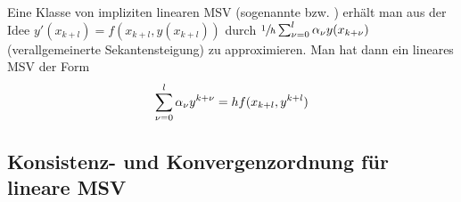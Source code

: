 Eine Klasse von impliziten linearen MSV (sogenannte  bzw. ) erhält man aus der Idee $y'(x_{k+l}) = f(x_{k+l},y(x_{k+l}))$ durch $\sfrac{1}{h}\sum_{\nu=0}^l \alpha_\nu y(x_{k+\nu})$ (verallgemeinerte Sekantensteigung) zu approximieren. Man hat dann ein lineares MSV der Form
\begin{align}
	\sum_{\nu=0}^l \alpha_\nu y^{k+\nu} = hf(x_{k+l},y^{k+l}) \notag
\end{align}

\subsection{Konsistenz- und Konvergenzordnung für lineare MSV}